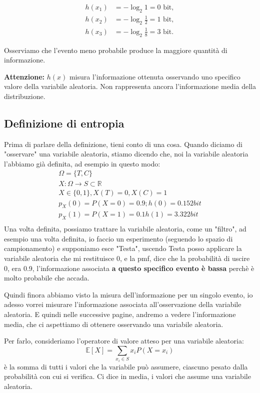 \[
\begin{aligned}
    h(x_1)&=-\log_2 1=0 \text{ bit},\\[4pt]
    h(x_2)&=-\log_2 \frac12=1 \text{ bit},\\[4pt]
    h(x_3)&=-\log_2 \frac18=3 \text{ bit}.
\end{aligned}
\]

Osserviamo che l'evento meno probabile produce la maggiore quantità di informazione.

\medskip
\noindent
\textbf{Attenzione:} $h(x)$ misura l'informazione ottenuta osservando uno specifico valore della variabile aleatoria. Non rappresenta ancora l'informazione media della distribuzione.

\subsection{Definizione di entropia}
Prima di parlare della definizione, tieni conto di una cosa.
Quando diciamo di "osservare" una variabile aleatoria, stiamo dicendo che, noi la variabile aleatoria l'abbiamo già definita, ad esempio in questo modo:
\[
\begin{aligned}
\Omega = \{T,C\} \\
X : \Omega \to S \subset \mathbb{R} \\
X \in \{0,1\} , X(T) = 0, X(C) = 1 \\
p_X(0) = P(X = 0) = 0.9 ; h(0) = 0.152 bit \\
p_X(1) = P(X = 1) = 0.1 h(1) = 3.322 bit  \\
\end{aligned}
\]
Una volta definita, possiamo trattare la variabile aleatoria, come un "filtro", ad esempio una volta definita, io faccio un esperimento (seguendo lo spazio di campionamento) e supponiamo esce "Testa", uscendo Testa
posso applicare la variabile aleatoria che mi restituisce 0, e la pmf, dice che la probabilità di uscire 0, era 0.9, l'informazione associata \textbf{a questo specifico evento è bassa} perchè è molto probabile che accada.

\begin{center}
    Quindi finora abbiamo visto la misura dell'informazione per un singolo evento, io adesso vorrei misurare l'informazione associata all'osservazione della variabile aleatoria.
    E quindi nelle successive pagine, andremo a vedere l'informazione media, che ci aspettiamo di ottenere osservando una variabile aleatoria.
\end{center}
Per farlo, consideriamo l'operatore di valore atteso per una variabile aleatoria:
\[
\mathbb{E}[X] = \sum_{x_i \in S} x_i P(X = x_i)
\]
è la somma di tutti i valori che la variabile può assumere, ciascuno pesato dalla probabilità con cui si verifica.
Ci dice in media, i valori che assume una variabile aleatoria.

